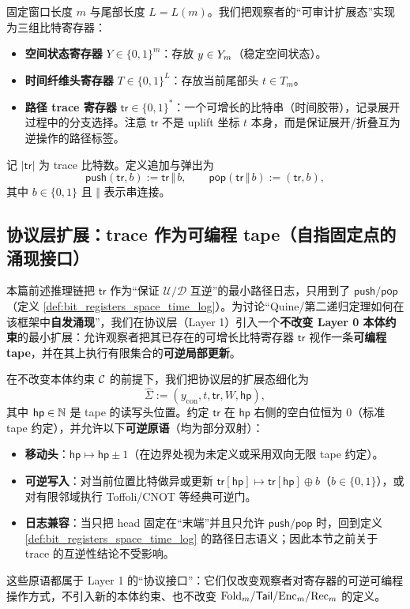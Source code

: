 \begin{definition}\label{def:bit_registers_space_time_log}
固定窗口长度 \(m\) 与尾部长度 \(L=L(m)\)。我们把观察者的“可审计扩展态”实现为三组比特寄存器：
\begin{itemize}
  \item \textbf{空间状态寄存器} \(Y\in\{0,1\}^m\)：存放 \(y\in Y_m\)（稳定空间状态）。
  \item \textbf{时间纤维头寄存器} \(T\in\{0,1\}^L\)：存放当前尾部头 \(t\in T_m\)。
  \item \textbf{路径 trace 寄存器} \(\mathsf{tr}\in\{0,1\}^\ast\)：一个可增长的比特串（时间胶带），记录展开过程中的分支选择。注意 \(\mathsf{tr}\) 不是 uplift 坐标 \(t\) 本身，而是保证展开/折叠互为逆操作的路径标签。
\end{itemize}
记 \(|\mathsf{tr}|\) 为 trace 比特数。定义追加与弹出为
$$
\mathsf{push}(\mathsf{tr},b):=\mathsf{tr}\,\Vert\, b,\qquad
\mathsf{pop}(\mathsf{tr}\,\Vert\, b):=(\mathsf{tr},b),
$$
其中 \(b\in\{0,1\}\) 且 \(\Vert\) 表示串连接。
\end{definition}

\subsection{协议层扩展：trace 作为可编程 tape（自指固定点的涌现接口）}\label{subsec:trace_as_programmable_tape}
本篇前述推理链把 \(\mathsf{tr}\) 作为“保证 \(\mathcal U/\mathcal D\) 互逆”的最小路径日志，只用到了 \(\mathsf{push}/\mathsf{pop}\)（定义 \ref{def:bit_registers_space_time_log}）。为讨论“Quine/第二递归定理如何在该框架中\textbf{自发涌现}”，我们在协议层（Layer 1）引入一个\textbf{不改变 Layer 0 本体约束}的最小扩展：允许观察者把其已存在的可增长比特寄存器 \(\mathsf{tr}\) 视作一条\textbf{可编程 tape}，并在其上执行有限集合的\textbf{可逆局部更新}。

\begin{definition}\label{def:programmable_trace_tape}
在不改变本体约束 \(\mathcal{C}\) 的前提下，我们把协议层的扩展态细化为
$$
\widehat\Sigma:=(y_{\mathrm{con}},t,\mathsf{tr},W,\mathsf{hp}),
$$
其中 \(\mathsf{hp}\in\mathbb{N}\) 是 tape 的读写头位置。约定 \(\mathsf{tr}\) 在 \(\mathsf{hp}\) 右侧的空白位恒为 \(0\)（标准 tape 约定），并允许以下\textbf{可逆原语}（均为部分双射）：
\begin{itemize}
  \item \textbf{移动头}：\(\mathsf{hp}\mapsto \mathsf{hp}\pm 1\)（在边界处视为未定义或采用双向无限 tape 约定）。
  \item \textbf{可逆写入}：对当前位置比特做异或更新 \(\mathsf{tr}[\mathsf{hp}]\mapsto \mathsf{tr}[\mathsf{hp}]\oplus b\)（\(b\in\{0,1\}\)），或对有限邻域执行 Toffoli/CNOT 等经典可逆门。
  \item \textbf{日志兼容}：当只把 head 固定在“末端”并且只允许 \(\mathsf{push}/\mathsf{pop}\) 时，回到定义 \ref{def:bit_registers_space_time_log} 的路径日志语义；因此本节之前关于 trace 的互逆性结论不受影响。
\end{itemize}
这些原语都属于 Layer 1 的“协议接口”：它们仅改变观察者对寄存器的可逆可编程操作方式，不引入新的本体约束、也不改变 \(\mathrm{Fold}_m/\mathsf{Tail}/\mathrm{Enc}_m/\mathrm{Rec}_m\) 的定义。
\end{definition}

